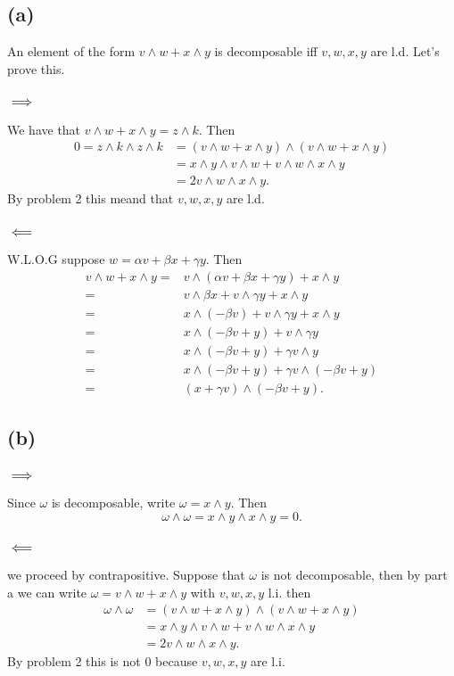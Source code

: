 \documentclass{article}
\begin{document}
\subsection*{(a)}
An element of the form $v\wedge w +x\wedge y$ is decomposable iff $v,w,x,y$ are l.d. Let's prove this.
\subsubsection*{$\implies$}
We have that $v\wedge w +x\wedge y=z\wedge k$. Then
\begin{align*}
	0=z\wedge k\wedge z\wedge k&=(v\wedge w +x\wedge y) \wedge (v\wedge w +x\wedge y)\\
	&=x\wedge y \wedge v \wedge w + v \wedge w \wedge x\wedge y\\
	&=2v \wedge w \wedge x\wedge y.
\end{align*}
By problem 2 this meand that $v,w,x,y$ are l.d.
\subsubsection*{$\impliedby$}
W.L.O.G suppose $w=\alpha v+\beta x+\gamma y$. Then
\begin{align*}
	v\wedge w + x\wedge y =&
	v\wedge(\alpha v + \beta x + \gamma y) + x\wedge y\\
	=& v\wedge\beta x + v\wedge\gamma y + x\wedge y\\
	=& x\wedge(-\beta v) + v\wedge\gamma y + x\wedge y\\
	=& x\wedge(-\beta v+y) + v\wedge\gamma y \\
	=& x\wedge(-\beta v+y) + \gamma v\wedge y \\
	=& x\wedge(-\beta v+y) + \gamma v\wedge(-\beta v + y) \\
	=& (x+\gamma v)\wedge(-\beta v+y).
\end{align*}

\subsection*{(b)}
\subsubsection*{$\implies$}
Since $\omega$ is decomposable, write $\omega=x\wedge y$. Then
\[
	\omega\wedge\omega=x\wedge y\wedge x\wedge y=0.
\]
\subsubsection*{$\impliedby$}
we proceed by contrapositive. Suppose that $\omega$ is not decomposable, then
by part a we can write $\omega=v\wedge w+x\wedge y$ with $v,w,x,y$ l.i. then
\begin{align*}
	\omega\wedge\omega&=\left(v\wedge w+x\wedge y\right)\wedge \left(v\wedge w+x\wedge y\right)\\
	&=x\wedge y \wedge v \wedge w + v \wedge w \wedge x\wedge y\\
	&=2v \wedge w \wedge x\wedge y.
\end{align*}
By problem 2 this is not 0 because $v,w,x,y$ are l.i.
\end{document}
